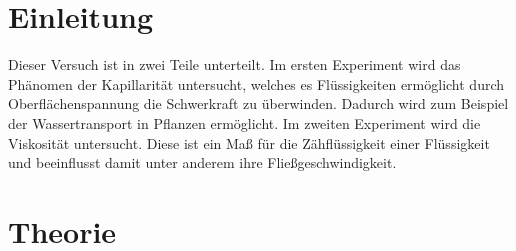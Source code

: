 \documentclass[12pt, a4paper, twoside]{scrartcl}
\begin{document}

\cleardoublepage
\tableofcontents
\cleardoublepage
\setcounter{page}{1}

\section{Einleitung}
\label{sec:einleitung}
Dieser Versuch ist in zwei Teile unterteilt. Im ersten Experiment wird das Phänomen der Kapillarität untersucht, welches  es Flüssigkeiten ermöglicht durch Oberflächenspannung die Schwerkraft zu überwinden. Dadurch wird zum Beispiel der Wassertransport in Pflanzen ermöglicht. Im zweiten Experiment wird die Viskosität untersucht. Diese ist ein Maß für die Zähflüssigkeit einer Flüssigkeit und beeinflusst damit unter anderem ihre Fließgeschwindigkeit.


\section{Theorie}
\label{sec:theorie}
\end{document}
